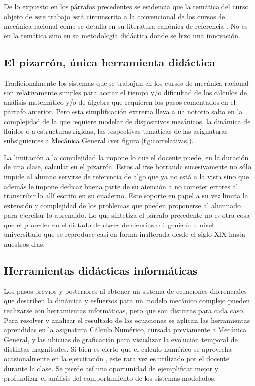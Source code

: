 De lo expuesto en los párrafos precedentes se evidencia que la temática del curso objeto de este trabajo está circunscrita a la convencional de los cursos de mecánica racional como se detalla en su literatura canónica de referencia \cite{landau}. No es en la temática sino en su metodología didáctica donde se hizo una innovación.

\subsection{El pizarrón, única herramienta didáctica}

Tradicionalmente los sistemas que se trabajan en los cursos de mecánica racional son relativamente simples para acotar el tiempo y/o dificultad de los cálculos de análisis matemático y/o de álgebra que requieren los pasos comentados en el párrafo anterior. Pero esta simplificación extrema lleva a un notorio salto en la complejidad de la que requiere modelar de dispositivos mecánicos, la dinámica de fluidos o a estructuras rígidas, las respectivas temáticas de las asignaturas subsiguientes a Mecánica General (ver figura \ref{fig:correlativas}).

La limitación a la complejidad la impone lo que el docente puede, en la duración de una clase, calcular en el pizarrón. Estos al irse borrando sucesivamente no sólo impide al alumno servirse de referencia de algo que ya no está a la vista sino que además le impone dedicar buena parte de su atención a no cometer errores al transcribir lo allí escrito en su cuaderno. Este soporte en papel a su vez limita la extensión y complejidad de los problemas que pueden proponerse al alumnado para ejercitar lo aprendido. 
Lo  que sintetiza el párrafo precedente no es otra cosa que el proceder en el dictado de clases de ciencias o ingeniería a nivel universitario que se reproduce casi en forma inalterada desde el siglo XIX hasta nuestros días.

\subsection{Herramientas didácticas informáticas}

Los pasos previos y posteriores al obtener un sistema de ecuaciones diferenciales que describen la dinámica y esfuerzos para un modelo mecánico complejo pueden realizarse con herramientas informáticas, pero que son distintas para cada caso.
Para resolver y analizar el resultado de las ecuaciones se aplican las herramientas aprendidas en la asignatura Cálculo Numérico, cursada previamente a Mecánica General, y las ubicuas de graficación para visualizar la evolución temporal de distintas magnitudes. Si bien es cierto que el cálculo numérico se aprovecha ocasionalmente en la ejercitación \cite{mirasso-raichman, caligaris-rodriguez}, este rara vez es utilizado por el docente durante la clase. Se pierde así una oportunidad de ejemplificar mejor y profundizar el análisis del comportamiento de los sistemas modelados.

